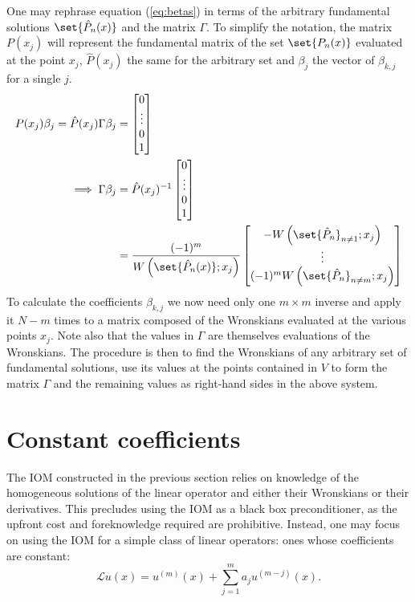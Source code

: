 \documentclass{article}
\begin{document}
One may rephrase equation (\ref{eq:betas}) in terms of the arbitrary fundamental solutions $\set{\hat{P}_n(x)}$ and the matrix $\Gamma$.
To simplify the notation, the matrix $P(x_j)$ will represent the fundamental matrix of the set $\set{P_n(x)}$ evaluated at the point $x_j$, $\hat{P}(x_j)$ the same for the arbitrary set and $\beta_j$ the vector of $\beta_{k,j}$ for a single $j$.
\begin{align*}
P(x_j) \beta_j = \hat{P}(x_j) \Gamma \beta_j & = \begin{bmatrix} 0 \\ \vdots \\ 0 \\ 1 \end{bmatrix} \\
\implies \Gamma \beta_j & = \hat{P}(x_j)^{-1} \begin{bmatrix} 0 \\ \vdots \\ 0 \\ 1 \end{bmatrix}
\\
& = \frac{(-1)^m}{\W{\set{\hat{P}_n(x)}}{x_j}} \begin{bmatrix} -\W{\set{\hat{P}_n}_{n\neq 1}}{x_j} \\ \vdots \\ (-1)^m \W{\set{\hat{P}_n}_{n\neq m}}{x_j} \end{bmatrix}
\end{align*}
To calculate the coefficients $\beta_{k,j}$ we now need only one $m \times m$ inverse and apply it $N-m$ times to a matrix composed of the Wronskians evaluated at the various points $x_j$.
Note also that the values in $\Gamma$ are themselves evaluations of the Wronskians.
The procedure is then to find the Wronskians of any arbitrary set of fundamental solutions, use its values at the points contained in $V$ to form the matrix $\Gamma$ and the remaining values as right-hand sides in the above system.

\section{Constant coefficients}

The IOM constructed in the previous section relies on knowledge of the homogeneous solutions of the linear operator and either their Wronskians or their derivatives.
This precludes using the IOM as a black box preconditioner, as the upfront cost and foreknowledge required are prohibitive.
Instead, one may focus on using the IOM for a simple class of linear operators: ones whose coefficients are constant:
\begin{equation*}
\mathcal{L}u(x) = u^{(m)}(x) + \sum_{j=1}^{m} a_j u^{(m-j)}(x) .
\end{equation*}
\end{document}
